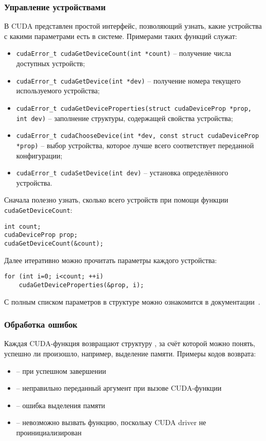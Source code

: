 \subsubsection*{Управление устройствами}
В CUDA представлен простой интерфейс, позволяющий узнать, какие устройства с какими параметрами есть в системе. Примерами таких функций служат:
\begin{itemize}
    \sloppy
    \item\texttt{cudaError\_t cudaGetDeviceCount(int *count)} -- получение числа доступных устройств;
    \item\texttt{cudaError\_t cudaGetDevice(int *dev)} -- получение номера текущего используемого устройства;
    \item\texttt{cudaError\_t cudaGetDeviceProperties(struct cudaDeviceProp *prop, int dev)} -- заполнение структуры, содержащей свойства устройства;
    \item\texttt{cudaError\_t cudaChooseDevice(int *dev, const struct cudaDeviceProp *prop)} -- выбор устройства, которое лучше всего соответствует переданной конфигурации;
    \item\texttt{cudaError\_t cudaSetDevice(int dev)} -- установка определённого устройства.
\end{itemize}

Сначала полезно узнать, сколько всего устройств при помощи функции \texttt{cudaGetDeviceCount}:
\begin{verbatim}
int count;
cudaDeviceProp prop; 
cudaGetDeviceCount(&count);
\end{verbatim}

Далее итеративно можно прочитать параметры каждого устройства:
\begin{verbatim}
for (int i=0; i<count; ++i)
    cudaGetDeviceProperties(&prop, i);
\end{verbatim}

С полным списком параметров в структуре  можно ознакомится в документации~\cite{CudaDeviceProp}.

\subsubsection*{Обработка ошибок}
Каждая CUDA-функция возвращают структуру , за счёт которой можно понять, успешно ли произошло, например, выделение памяти. Примеры кодов возврата:
\begin{itemize}
    \item{} -- при успешном завершении
    \item{} -- неправильно переданный аргумент при вызове CUDA-функции
    \item{} -- ошибка выделения памяти
    \item{} -- невозможно вызвать функцию, поскольку CUDA driver не проинициализирован
\end{itemize}


